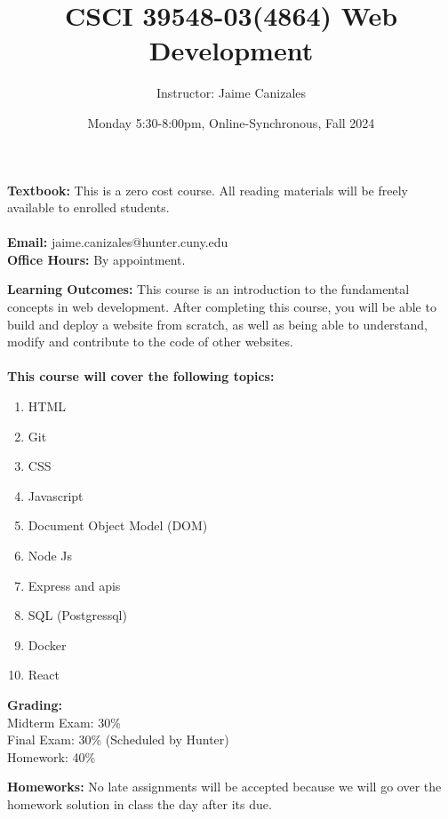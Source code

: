 \documentclass[a4paper]{article}
\title{CSCI 39548-03(4864) Web Development}
\author{Instructor: Jaime Canizales}
\date{Monday 5:30-8:00pm, Online-Synchronous, Fall 2024}
\begin{document}
\maketitle

\textbf{Textbook:} This is a zero cost course. All reading materials will be freely available to enrolled students.
\\ \\
\textbf{Email:} jaime.canizales@hunter.cuny.edu \\
\textbf{Office Hours:} By appointment.

\textbf{Learning Outcomes:} This course is an introduction to the fundamental concepts in web development. After completing this course, you will be able to build and deploy a website from scratch, as well as being able to understand, modify and contribute to the code of other websites. \\\\ 
\textbf{This course will cover the following topics:} 
\begin{enumerate}
    \item HTML
    \item Git
    \item CSS
    \item Javascript
    \item Document Object Model (DOM)
    \item Node Js
    \item Express and apis
    \item SQL (Postgressql)
    \item Docker
    \item React
\end{enumerate} 

\textbf{Grading: } \\
Midterm Exam: \hspace{1mm} 30\% \\
Final Exam: \hspace{6mm} 30\% (Scheduled by Hunter)\\
Homework: \hspace{8mm} 40\%

\textbf{Homeworks: } No late assignments will be accepted because we will go over the homework solution in class the day after its due. 
\end{document}

